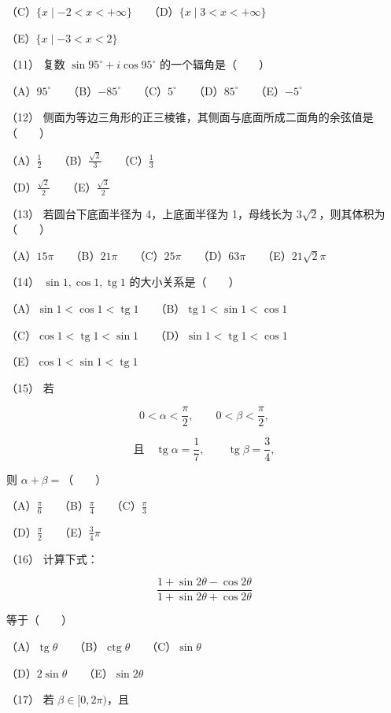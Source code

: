 \begin{answer}
（C）$\{x\mid -2<x<+\infty\}$　　（D）$\{x\mid 3<x<+\infty\}$

（E）$\{x\mid -3<x<2\}$

（11） 复数 $\sin95^\circ+i\cos95^\circ$ 的一个辐角是\mbox{（　　）}

（A）$95^\circ$　　（B）$-85^\circ$　　（C）$5^\circ$　　（D）$85^\circ$　　（E）$-5^\circ$

（12） 侧面为等边三角形的正三棱锥，其侧面与底面所成二面角的余弦值是\mbox{（　　）}

（A）$\frac12$　　（B）$\frac{\sqrt2}{3}$　　（C）$\frac13$

（D）$\frac{\sqrt2}{2}$　　（E）$\frac{\sqrt3}{2}$

（13） 若圆台下底面半径为 4，上底面半径为 1，母线长为 $3\sqrt2$，则其体积为\mbox{（　　）}

（A）$15\pi$　　（B）$21\pi$　　（C）$25\pi$　　（D）$63\pi$　　（E）$21\sqrt2\pi$

（14） $\sin1,\cos1,\operatorname{tg}1$ 的大小关系是\mbox{（　　）}

（A）$\sin1<\cos1<\operatorname{tg}1$　　（B）$\operatorname{tg}1<\sin1<\cos1$

（C）$\cos1<\operatorname{tg}1<\sin1$　　（D）$\sin1<\operatorname{tg}1<\cos1$

（E）$\cos1<\sin1<\operatorname{tg}1$


（15） 若

\nopagebreak[4]
\[
0<\alpha<\frac\pi2,\qquad 0<\beta<\frac\pi2,
\]

\nopagebreak[4]
\[
\text{且}\quad \operatorname{tg}\alpha=\frac17,\qquad \operatorname{tg}\beta=\frac34,
\]

则 $\alpha+\beta=$\mbox{（　　）}

（A）$\frac\pi6$　　（B）$\frac\pi4$　　（C）$\frac\pi3$

（D）$\frac\pi2$　　（E）$\frac34\pi$

（16） 计算下式：

\nopagebreak[4]
\[
\frac{1+\sin2\theta-\cos2\theta}
{1+\sin2\theta+\cos2\theta}
\]

等于\mbox{（　　）}

（A）$\operatorname{tg}\theta$　　（B）$\operatorname{ctg}\theta$　　（C）$\sin\theta$

（D）$2\sin\theta$　　（E）$\sin2\theta$

（17） 若 $\beta\in[0,2\pi)$，且


\end{answer}
